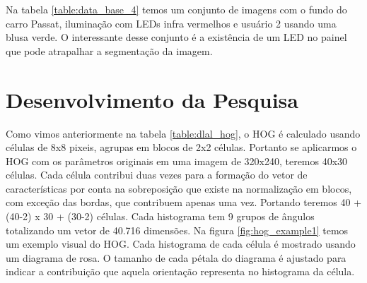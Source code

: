 

Na tabela \ref{table:data_base_4} temos um conjunto de imagens com o fundo do carro Passat, iluminação com LEDs infra vermelhos e usuário 2 usando uma blusa verde. O interessante desse conjunto é a existência de um LED no painel que pode atrapalhar a segmentação da imagem.


\section{Desenvolvimento da Pesquisa}

Como vimos anteriormente na tabela \ref{table:dlal_hog}, o HOG é calculado usando células de 8x8 pixeis, agrupas em blocos de 2x2 células. Portanto se aplicarmos o HOG com os parâmetros originais em uma imagem de 320x240, teremos 40x30 células. Cada célula contribui duas vezes para a formação do vetor de características por conta na sobreposição que existe na normalização em blocos, com exceção das bordas, que contribuem apenas uma vez. Portando teremos 40 + (40-2) x 30 + (30-2) células. Cada histograma tem 9 grupos de ângulos totalizando um vetor de 40.716 dimensões. Na figura \ref{fig:hog_example1} temos um exemplo visual do HOG. Cada histograma de cada célula é mostrado usando um diagrama de rosa. O tamanho de cada pétala do diagrama é ajustado para indicar a contribuição que aquela orientação representa no histograma da célula. 

